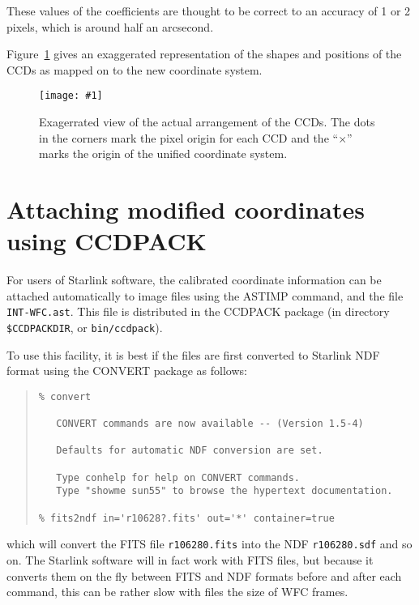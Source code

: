 \documentclass[twoside,11pt]{article}
\newcommand{\htmladdnormallink}[2]{#1}
\newcommand{\htmladdimg}[1]{}
\newcommand{\latexhtml}[2]{#1}
\newcommand{\xref}[3]{#1}
\renewcommand{\_}{\texttt{\symbol{95}}}
\newcommand{\ttsize}{\latexhtml{\small}{}}
\newenvironment{myquote}{\begin{quote}\ttsize}{\end{quote}}
\newcommand{\myfig} [5] {
  \begin{figure}
    \centering\texttt{[image: \#1]}
    \typeout{#1 inserted on page \arabic{page}}
    \caption{\label{#4}#5}
  \end{figure}
  }
\newcommand{\myfig}[5]{
    \htmladdimg{#3}\\
    Figure: \label{#4} #5
    }
\begin{document}
These values of the coefficients are thought to be correct to an
accuracy of 1 or 2 pixels, which is around half an arcsecond.

Figure~\ref{fig:exag} gives an exaggerated representation of the
shapes and positions of the CCDs as mapped on to the new coordinate system.

\myfig{exag4.eps}{}{exag4.gif}{fig:exag}{Exagerrated view of the
actual arrangement of the CCDs.  The dots in the corners mark the
pixel origin for each CCD and the ``$\times$'' marks the origin of
the unified coordinate system.}

\latexhtml{\newpage}{\htmlrule}
\section{Attaching modified coordinates using CCDPACK}

For users of Starlink software,
the calibrated coordinate information can be attached automatically
to image files using the
\htmladdnormallink{ASTIMP}{http://capc23.ast.cam.ac.uk/star/local/docs/sun139.htx/node70.html#xref_ASTIMP}
command, and the file {\tt INT-WFC.ast}.
This file is distributed in the CCDPACK package
(in directory {\tt \$CCDPACK\_DIR}, or {\tt bin/ccdpack}).

To use this facility,
it is best if the files are first converted to Starlink \xref{NDF}{sun33}{}
format using the \xref{CONVERT}{sun55}{} package as follows:
\begin{myquote}
\begin{verbatim}
% convert

   CONVERT commands are now available -- (Version 1.5-4)

   Defaults for automatic NDF conversion are set.

   Type conhelp for help on CONVERT commands.
   Type "showme sun55" to browse the hypertext documentation.

% fits2ndf in='r10628?.fits' out='*' container=true
\end{verbatim}
\end{myquote}
which will convert the FITS file {\tt r106280.fits}
into the NDF {\tt r106280.sdf} and so on.
The Starlink software will in fact work with FITS files,
but because it converts them on the fly between FITS and NDF formats
before and after each command,
this can be rather slow with files the size of WFC frames.
\end{document}
